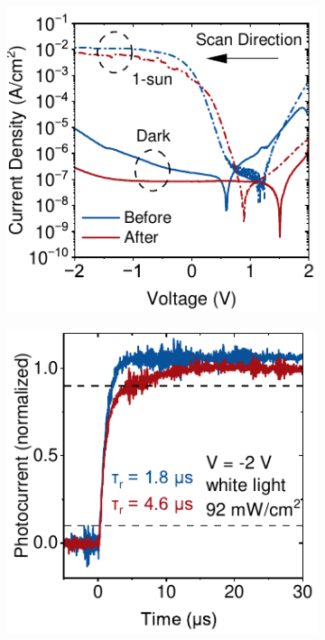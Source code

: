 \begin{figure}[htbp]
    \centering
    \begin{subfigure}{0.33\textwidth}
        \centering
        \includegraphics[width=\textwidth]{chapters/transport_layers/images/JV_Before_After_Reverse.pdf}
        \caption{}
        \label{}
    \end{subfigure}
    \hfill
    \begin{subfigure}{0.32\textwidth}
        \centering
        \includegraphics[width=\textwidth]{chapters/transport_layers/images/TPC_Before_After.pdf}

\end{subfigure}
\end{figure}
